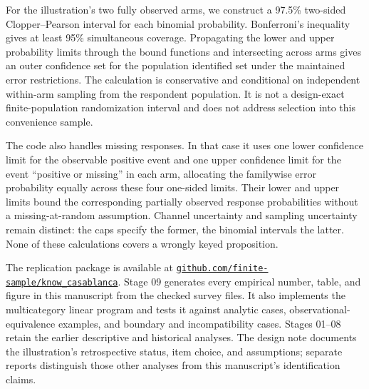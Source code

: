 \documentclass[11pt]{article}
\begin{document}
For the illustration's two fully observed arms, we construct a 97.5\% two-sided Clopper--Pearson interval for each binomial probability. Bonferroni's inequality gives at least 95\% simultaneous coverage. Propagating the lower and upper probability limits through the bound functions and intersecting across arms gives an outer confidence set for the population identified set under the maintained error restrictions. The calculation is conservative and conditional on independent within-arm sampling from the respondent population. It is not a design-exact finite-population randomization interval and does not address selection into this convenience sample.

The code also handles missing responses. In that case it uses one lower confidence limit for the observable positive event and one upper confidence limit for the event ``positive or missing'' in each arm, allocating the familywise error probability equally across these four one-sided limits. Their lower and upper limits bound the corresponding partially observed response probabilities without a missing-at-random assumption. Channel uncertainty and sampling uncertainty remain distinct: the caps specify the former, the binomial intervals the latter. None of these calculations covers a wrongly keyed proposition.

The replication package is available at \href{https://github.com/finite-sample/know_casablanca}{\nolinkurl{github.com/finite-sample/know_casablanca}}. Stage 09 generates every empirical number, table, and figure in this manuscript from the checked survey files. It also implements the multicategory linear program and tests it against analytic cases, observational-equivalence examples, and boundary and incompatibility cases. Stages 01--08 retain the earlier descriptive and historical analyses. The design note documents the illustration's retrospective status, item choice, and assumptions; separate reports distinguish those other analyses from this manuscript's identification claims.
\end{document}
